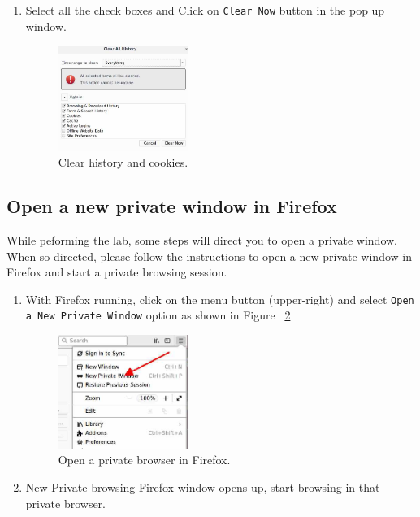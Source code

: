 \begin{enumerate}
  \item Select all the check boxes and Click on {\tt Clear Now} button in the pop up window. 
	\begin{figure}[ht]
	\centering	
	\includegraphics[width=0.4\textwidth]{Figs/clearhistory4.jpg}
	\caption{Clear history and cookies.} 
	\label{fig:clear_history4}
	\end{figure}

\end{enumerate}
	

\subsection{Open a new private window in Firefox} 
\label{private}
While peforming the lab, some steps will direct you to open a private window.  When so directed, 
please follow the instructions to open a new private window in Firefox and start a private browsing session.

\begin{enumerate}
  \item With Firefox running, click on the menu button (upper-right) and select {\tt Open a New Private Window} option as shown in Figure ~\ref{fig:private_window}

	\begin{figure}[H]
	\centering	
	\includegraphics[width=0.4\textwidth]{Figs/privatewindow.jpg}
	\caption{Open a private browser in Firefox.} 
	\label{fig:private_window}
	\end{figure}

  \item New Private browsing Firefox window opens up, start browsing in that private browser.


\end{enumerate}


